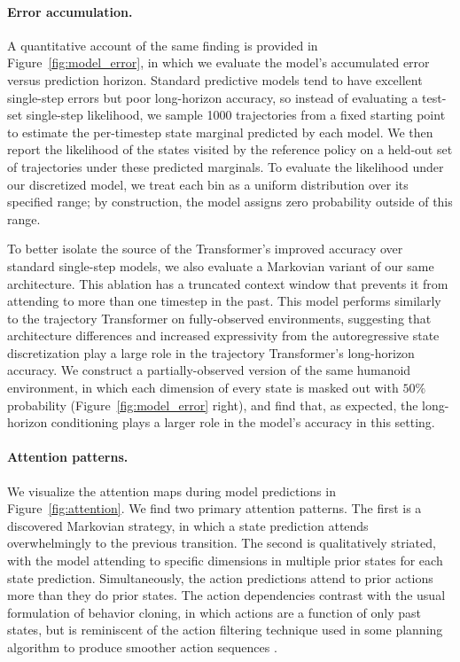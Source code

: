 \paragraph{Error accumulation.}
A quantitative account of the same finding is provided in Figure~\ref{fig:model_error}, in which we evaluate the model's accumulated error versus prediction horizon.
Standard predictive models tend to have excellent single-step errors but poor long-horizon accuracy, so instead of evaluating a test-set single-step likelihood, we sample 1000 trajectories from a fixed starting point to estimate the per-timestep state marginal predicted by each model.
We then report the likelihood of the states visited by the reference policy on a held-out set of trajectories under these predicted marginals.
To evaluate the likelihood under our discretized model, we treat each bin as a uniform distribution over its specified range; by construction, the model assigns zero probability outside of this range.

To better isolate the source of the Transformer's improved accuracy over standard single-step models, we also evaluate a Markovian variant of our same architecture.
This ablation has a truncated context window that prevents it from attending to more than one timestep in the past.
This model performs similarly to the trajectory Transformer on fully-observed environments, suggesting that architecture differences and increased expressivity from the autoregressive state discretization play a large role in the trajectory Transformer's long-horizon accuracy.
We construct a partially-observed version of the same humanoid environment, in which each dimension of every state is masked out with $50\%$ probability (Figure~\ref{fig:model_error} right), and find that, as expected, the long-horizon conditioning plays a larger role in the model's accuracy in this setting.

\paragraph{Attention patterns.}
We visualize the attention maps during model predictions in Figure~\ref{fig:attention}.
We find two primary attention patterns.
The first is a discovered Markovian strategy, in which a state prediction attends overwhelmingly to the previous transition.
The second is qualitatively striated, with the model attending to specific dimensions in multiple prior states for each state prediction.
Simultaneously, the action predictions attend to prior actions more than they do prior states.
The action dependencies contrast with the usual formulation of behavior cloning, in which actions are a function of only past states, but is reminiscent of the action filtering technique used in some planning algorithm to produce smoother action sequences \citep{nagabandi2019pddm}.


